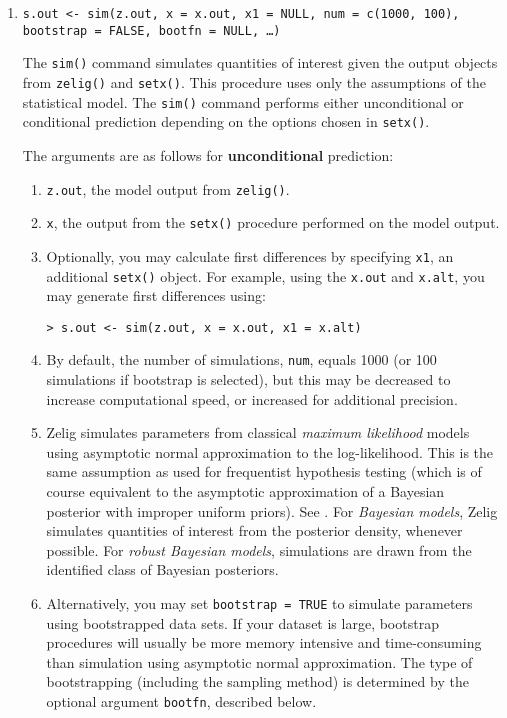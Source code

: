 \begin{enumerate}
\item {\tt s.out <- sim(z.out, x = x.out, x1 = NULL, num = c(1000,
    100), bootstrap = FALSE, bootfn = NULL, \dots)}
 
  The {\tt sim()} command simulates quantities of interest given the
  output objects from \texttt{zelig()} and \texttt{setx()}.  This
  procedure uses only the assumptions of the statistical model.  The
  {\tt sim()} command performs either unconditional or conditional
  prediction depending on the options chosen in {\tt setx()}.
  
  The arguments are as follows for \textbf{unconditional} prediction:
  \begin{enumerate}
  \item {\tt z.out}, the model output from {\tt zelig()}.
  \item {\tt x}, the output from the {\tt setx()} procedure performed
    on the model output.
  \item Optionally, you may calculate first differences by specifying
    {\tt x1}, an additional {\tt setx()} object.  For example, using
    the {\tt x.out} and {\tt x.alt}, you may generate first
    differences using:
\begin{verbatim}
> s.out <- sim(z.out, x = x.out, x1 = x.alt)
\end{verbatim}
    
  \item By default, the number of simulations, {\tt num}, equals 1000
    (or 100 simulations if bootstrap is selected), but this may be
    decreased to increase computational speed, or increased for
    additional precision.
    
  \item Zelig simulates parameters from classical \emph{maximum
      likelihood} models using asymptotic normal approximation to the
    log-likelihood.  This is the same assumption as used for
    frequentist hypothesis testing (which is of course equivalent to
    the asymptotic approximation of a Bayesian posterior with improper
    uniform priors).  See .
    For \emph{Bayesian models}, Zelig simulates quantities of interest
    from the posterior density, whenever possible.  For \emph{robust
      Bayesian models}, simulations are drawn from the identified
    class of Bayesian posteriors.
  
  \item Alternatively, you may set {\tt bootstrap = TRUE} to simulate
    parameters using bootstrapped data sets.  If your dataset is
    large, bootstrap procedures will usually be more memory intensive
    and time-consuming than simulation using asymptotic normal
    approximation.  The type of bootstrapping (including the sampling
    method) is determined by the optional argument {\tt bootfn},
    described below.
  

\end{enumerate}
\end{enumerate}
